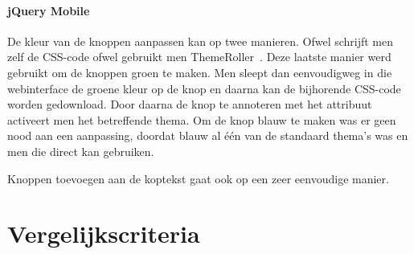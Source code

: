 \paragraph{jQuery Mobile} 
De kleur van de knoppen aanpassen kan op twee manieren. 
Ofwel schrijft men zelf de CSS-code ofwel gebruikt men ThemeRoller~\cite{JQuery2012c}. 
Deze laatste manier werd gebruikt om de knoppen groen te maken. 
Men sleept dan eenvoudigweg in die webinterface de groene kleur op de knop en daarna kan de bijhorende CSS-code worden gedownload. 
Door daarna de knop te annoteren met het  attribuut activeert men het betreffende thema. 
Om de knop blauw te maken was er geen nood aan een aanpassing, doordat blauw al één van de standaard thema's was en men die direct kan gebruiken.

Knoppen toevoegen aan de koptekst gaat ook op een zeer eenvoudige manier.


\section{Vergelijkscriteria}
\label{sec:evaluatie-criteria}